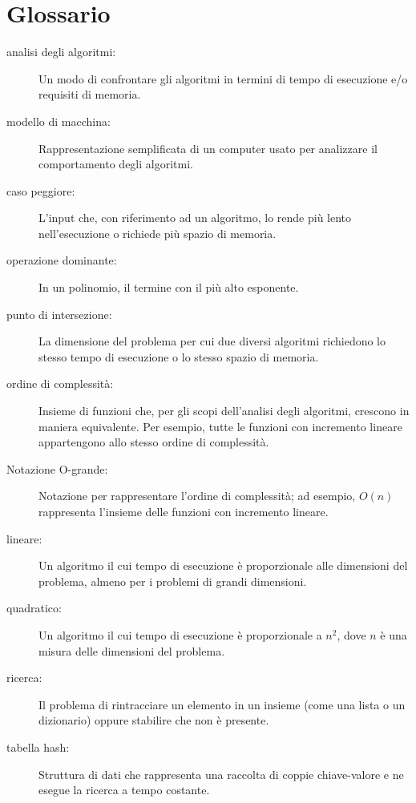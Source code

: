 \documentclass[10pt]{book}
\begin{document}
\section{Glossario}

\begin{description}

\item[analisi degli algoritmi:] Un modo di confrontare gli algoritmi in termini di tempo di esecuzione e/o requisiti di memoria.

\item[modello di macchina:] Rappresentazione semplificata di un computer usato per analizzare il comportamento degli algoritmi.

\item[caso peggiore:] L'input che, con riferimento ad un algoritmo, lo rende più lento nell'esecuzione o richiede più spazio di memoria.

\item[operazione dominante:] In un polinomio, il termine con il più alto esponente.

\item[punto di intersezione:] La dimensione del problema per cui due diversi algoritmi richiedono lo stesso tempo di esecuzione o lo stesso spazio di memoria.

\item[ordine di complessità:] Insieme di funzioni che, per gli scopi dell'analisi degli algoritmi, crescono in maniera equivalente. Per esempio, tutte le funzioni con incremento lineare appartengono allo stesso ordine di complessità.

\item[Notazione O-grande:] Notazione per rappresentare l'ordine di complessità;
ad esempio, $O(n)$ rappresenta l'insieme delle funzioni con incremento lineare.

\item[lineare:] Un algoritmo il cui tempo di esecuzione è proporzionale alle dimensioni del problema, almeno per i problemi di grandi dimensioni.

\item[quadratico:] Un algoritmo il cui tempo di esecuzione è proporzionale a
$n^2$, dove $n$ è una misura delle dimensioni del problema.

\item[ricerca:] Il problema di rintracciare un elemento in un insieme (come una lista o un dizionario) oppure stabilire che non è presente.

\item[tabella hash:] Struttura di dati che rappresenta una raccolta di coppie chiave-valore e ne esegue la ricerca a tempo costante.

\end{description}

\printindex

\clearemptydoublepage
\end{document}
